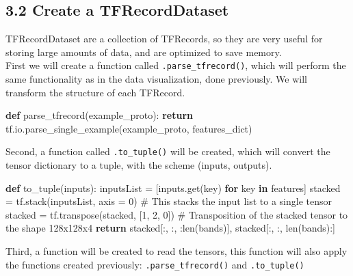 \documentclass[
  letterpaper,
  DIV=11,
  numbers=noendperiod]{scrreprt}
\newenvironment{Shaded}{\begin{snugshade}}{\end{snugshade}}
\newcommand{\BuiltInTok}[1]{\textcolor[rgb]{0.00,0.23,0.31}{#1}}
\newcommand{\CommentTok}[1]{\textcolor[rgb]{0.37,0.37,0.37}{#1}}
\newcommand{\ControlFlowTok}[1]{\textcolor[rgb]{0.00,0.23,0.31}{\textbf{#1}}}
\newcommand{\DecValTok}[1]{\textcolor[rgb]{0.68,0.00,0.00}{#1}}
\newcommand{\KeywordTok}[1]{\textcolor[rgb]{0.00,0.23,0.31}{\textbf{#1}}}
\newcommand{\NormalTok}[1]{\textcolor[rgb]{0.00,0.23,0.31}{#1}}
\newcommand{\OperatorTok}[1]{\textcolor[rgb]{0.37,0.37,0.37}{#1}}
\begin{document}
\subsection{3.2 Create a
TFRecordDataset}\label{create-a-tfrecorddataset}

TFRecordDataset are a collection of TFRecords, so they are very useful
for storing large amounts of data, and are optimized to save memory.\\
First we will create a function called \texttt{.parse\_tfrecord()},
which will perform the same functionality as in the data visualization,
done previously. We will transform the structure of each TFRecord.

\begin{Shaded}
\begin{Highlighting}[]
\KeywordTok{def}\NormalTok{ parse\_tfrecord(example\_proto):}
    \ControlFlowTok{return}\NormalTok{ tf.io.parse\_single\_example(example\_proto, features\_dict)}
\end{Highlighting}
\end{Shaded}

Second, a function called \texttt{.to\_tuple()} will be created, which
will convert the tensor dictionary to a tuple, with the scheme (inputs,
outputs).

\begin{Shaded}
\begin{Highlighting}[]
\KeywordTok{def}\NormalTok{ to\_tuple(inputs):}
\NormalTok{    inputsList }\OperatorTok{=}\NormalTok{ [inputs.get(key) }\ControlFlowTok{for}\NormalTok{ key }\KeywordTok{in}\NormalTok{ features]}
\NormalTok{    stacked }\OperatorTok{=}\NormalTok{ tf.stack(inputsList, axis }\OperatorTok{=} \DecValTok{0}\NormalTok{) }\CommentTok{\# This stacks the input list to a single tensor}
\NormalTok{    stacked }\OperatorTok{=}\NormalTok{ tf.transpose(stacked, [}\DecValTok{1}\NormalTok{, }\DecValTok{2}\NormalTok{, }\DecValTok{0}\NormalTok{]) }\CommentTok{\# Transposition of the stacked tensor to the shape 128x128x4}
    \ControlFlowTok{return}\NormalTok{ stacked[:, :, :}\BuiltInTok{len}\NormalTok{(bands)], stacked[:, :, }\BuiltInTok{len}\NormalTok{(bands):]}
\end{Highlighting}
\end{Shaded}

Third, a function will be created to read the tensors, this function
will also apply the functions created previously:
\texttt{.parse\_tfrecord()} and \texttt{.to\_tuple()}
\end{document}
